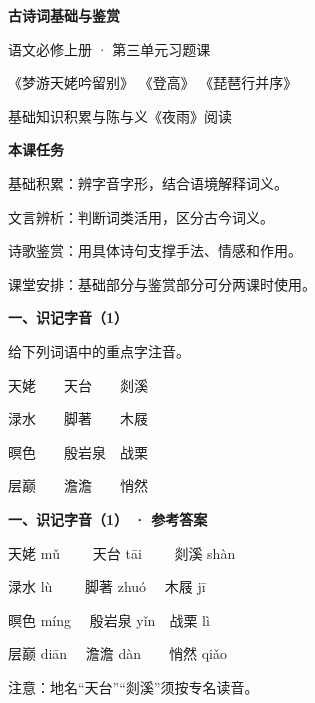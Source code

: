 \documentclass[UTF8,10pt,aspectratio=169]{ctexbeamer}
\newcommand{\PageHeading}[1]{\begin{center}{\Large\bfseries #1}\end{center}\vspace{0.2cm}}
\begin{document}
\begin{frame}
\PageHeading{古诗词基础与鉴赏}
语文必修上册 · 第三单元习题课\par\vspace{0.23cm}
《梦游天姥吟留别》  《登高》  《琵琶行并序》\par\vspace{0.23cm}
基础知识积累与陈与义《夜雨》阅读\par\vspace{0.23cm}
\end{frame}
\begin{frame}
\PageHeading{本课任务}
基础积累：辨字音字形，结合语境解释词义。\par\vspace{0.23cm}
文言辨析：判断词类活用，区分古今词义。\par\vspace{0.23cm}
诗歌鉴赏：用具体诗句支撑手法、情感和作用。\par\vspace{0.23cm}
课堂安排：基础部分与鉴赏部分可分两课时使用。\par\vspace{0.23cm}
\end{frame}
\begin{frame}
\PageHeading{一、识记字音（1）}
给下列词语中的重点字注音。\par\vspace{0.23cm}
天姥　　天台　　剡溪\par\vspace{0.23cm}
渌水　　脚著　　木屐\par\vspace{0.23cm}
暝色　　殷岩泉　战栗\par\vspace{0.23cm}
层巅　　澹澹　　悄然\par\vspace{0.23cm}
\end{frame}
\begin{frame}
\PageHeading{一、识记字音（1） · 参考答案}
天姥 mǔ　　 天台 tāi　　 剡溪 shàn\par\vspace{0.23cm}
渌水 lù　　 脚著 zhuó　 木屐 jī\par\vspace{0.23cm}
暝色 míng　 殷岩泉 yǐn　战栗 lì\par\vspace{0.23cm}
层巅 diān　 澹澹 dàn　　悄然 qiǎo\par\vspace{0.23cm}
注意：地名“天台”“剡溪”须按专名读音。\par\vspace{0.23cm}
\end{frame}
\end{document}
